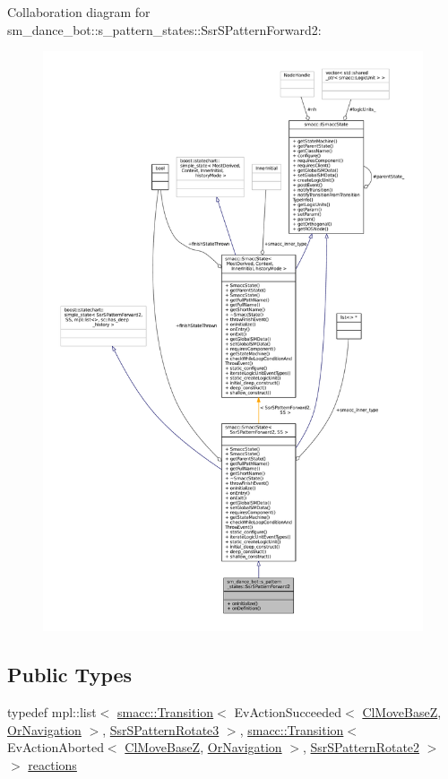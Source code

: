 Collaboration diagram for sm\+\_\+dance\+\_\+bot\+:\+:s\+\_\+pattern\+\_\+states\+:\+:Ssr\+S\+Pattern\+Forward2\+:
\nopagebreak
\begin{figure}[H]
\begin{center}
\leavevmode
\includegraphics[width=350pt]{structsm__dance__bot_1_1s__pattern__states_1_1SsrSPatternForward2__coll__graph}
\end{center}
\end{figure}
\subsection*{Public Types}
\begin{DoxyCompactItemize}
\item 
typedef mpl\+::list$<$ \hyperlink{classsmacc_1_1Transition}{smacc\+::\+Transition}$<$ Ev\+Action\+Succeeded$<$ \hyperlink{classmove__base__z__client_1_1ClMoveBaseZ}{Cl\+Move\+BaseZ}, \hyperlink{classsm__dance__bot_1_1OrNavigation}{Or\+Navigation} $>$, \hyperlink{structsm__dance__bot_1_1s__pattern__states_1_1SsrSPatternRotate3}{Ssr\+S\+Pattern\+Rotate3} $>$, \hyperlink{classsmacc_1_1Transition}{smacc\+::\+Transition}$<$ Ev\+Action\+Aborted$<$ \hyperlink{classmove__base__z__client_1_1ClMoveBaseZ}{Cl\+Move\+BaseZ}, \hyperlink{classsm__dance__bot_1_1OrNavigation}{Or\+Navigation} $>$, \hyperlink{structsm__dance__bot_1_1s__pattern__states_1_1SsrSPatternRotate2}{Ssr\+S\+Pattern\+Rotate2} $>$ $>$ \hyperlink{structsm__dance__bot_1_1s__pattern__states_1_1SsrSPatternForward2_a06f8b4f719c4d6a85429b8ed734b9a01}{reactions}
\end{DoxyCompactItemize}
